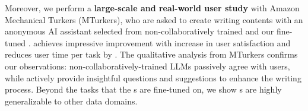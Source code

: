 Moreover, we perform a \textbf{large-scale and real-world user study} with \numturker{} Amazon Mechanical Turkers (MTurkers), who are asked to create writing contents with an anonymous AI assistant selected from non-collaboratively trained and our fine-tuned \name{}. \name{} achieves impressive improvement with \realsatisfyimprov increase in user satisfaction and reduces user time per task by \realtimeimprov{}. The qualitative analysis from MTurkers confirms our observations: non-collaboratively-trained LLMs passively agree with users, while \name{} actively provide insightful questions and suggestions to enhance the writing process. 
Beyond the tasks that the \name{}s are fine-tuned on, we show \name{}s are highly generalizable to other data domains. 











